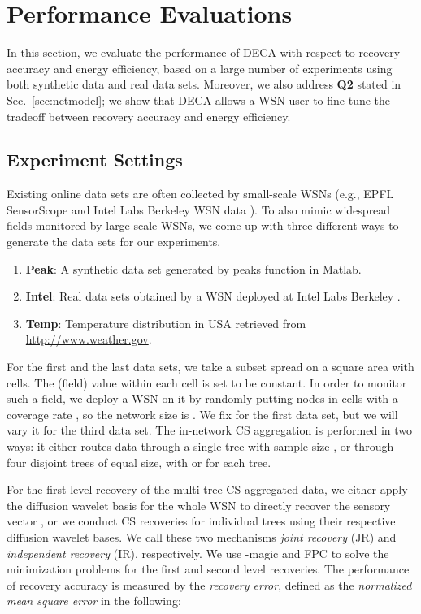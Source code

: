 \documentclass[conference]{IEEEtran}
\begin{document}
\section{Performance Evaluations} \label{sec:perf}
In this section, we evaluate the performance of DECA with respect to recovery accuracy and energy efficiency, based on a large number of experiments using both synthetic data and real data sets. Moreover, we also address \textbf{Q2} stated in Sec.~\ref{sec:netmodel}; we show that DECA allows a WSN user to fine-tune the tradeoff between recovery accuracy and energy efficiency.

  \subsection{Experiment Settings}
Existing online data sets are often collected by small-scale WSNs (e.g., EPFL SensorScope \cite{Sensorscope} and Intel Labs Berkeley WSN data \cite{Intel}). To also mimic widespread fields monitored by large-scale WSNs, we come up with three different ways to generate the data sets for our experiments.
    \begin{enumerate}
\item \textbf{Peak}: A synthetic data set generated by \textsf{peaks} function in Matlab.
\item \textbf{Intel}: Real data sets obtained by a WSN deployed at Intel Labs Berkeley \cite{Intel}.
\item \textbf{Temp}: Temperature distribution in USA retrieved from \url{http://www.weather.gov}.
\end{enumerate}

    For the first and the last data sets, we take a subset spread on a square area with  cells. The (field) value within each cell is set to be constant. In order to monitor such a field, we deploy a WSN on it by randomly putting nodes in cells with a coverage rate , so the network size is . We fix  for the first data set, but we will vary it for the third data set. The in-network CS aggregation is performed in two ways: it either routes data through a single tree with sample size , or through four disjoint trees of equal size, with  or  for each tree.

    For the first level recovery of the multi-tree CS aggregated data, we either apply the diffusion wavelet basis for the whole WSN to directly recover the sensory vector , or we conduct CS recoveries for individual trees using their respective diffusion wavelet bases. We call these two mechanisms \textit{joint recovery} (JR) and \textit{independent recovery} (IR), respectively. We use -magic \cite{L1magic} and FPC \cite{MaGC-MP09} to solve the minimization problems for the first and second level recoveries. The performance of recovery accuracy is measured by the \textit{recovery error}, defined as the \textit{normalized mean square error} in the following:
    
\end{document}
